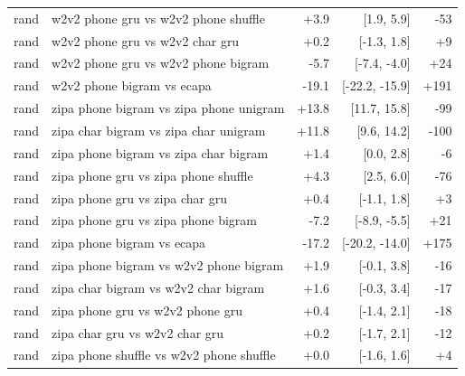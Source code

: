 \begin{tabular}{llrrr}
rand & w2v2 phone gru vs w2v2 phone shuffle & +3.9 & [1.9, 5.9] & -53 \\
rand & w2v2 phone gru vs w2v2 char gru & +0.2 & [-1.3, 1.8] & +9 \\
rand & w2v2 phone gru vs w2v2 phone bigram & -5.7 & [-7.4, -4.0] & +24 \\
rand & w2v2 phone bigram vs ecapa & -19.1 & [-22.2, -15.9] & +191 \\
rand & zipa phone bigram vs zipa phone unigram & +13.8 & [11.7, 15.8] & -99 \\
rand & zipa char bigram vs zipa char unigram & +11.8 & [9.6, 14.2] & -100 \\
rand & zipa phone bigram vs zipa char bigram & +1.4 & [0.0, 2.8] & -6 \\
rand & zipa phone gru vs zipa phone shuffle & +4.3 & [2.5, 6.0] & -76 \\
rand & zipa phone gru vs zipa char gru & +0.4 & [-1.1, 1.8] & +3 \\
rand & zipa phone gru vs zipa phone bigram & -7.2 & [-8.9, -5.5] & +21 \\
rand & zipa phone bigram vs ecapa & -17.2 & [-20.2, -14.0] & +175 \\
rand & zipa phone bigram vs w2v2 phone bigram & +1.9 & [-0.1, 3.8] & -16 \\
rand & zipa char bigram vs w2v2 char bigram & +1.6 & [-0.3, 3.4] & -17 \\
rand & zipa phone gru vs w2v2 phone gru & +0.4 & [-1.4, 2.1] & -18 \\
rand & zipa char gru vs w2v2 char gru & +0.2 & [-1.7, 2.1] & -12 \\
rand & zipa phone shuffle vs w2v2 phone shuffle & +0.0 & [-1.6, 1.6] & +4 \\
\bottomrule
\end{tabular}
